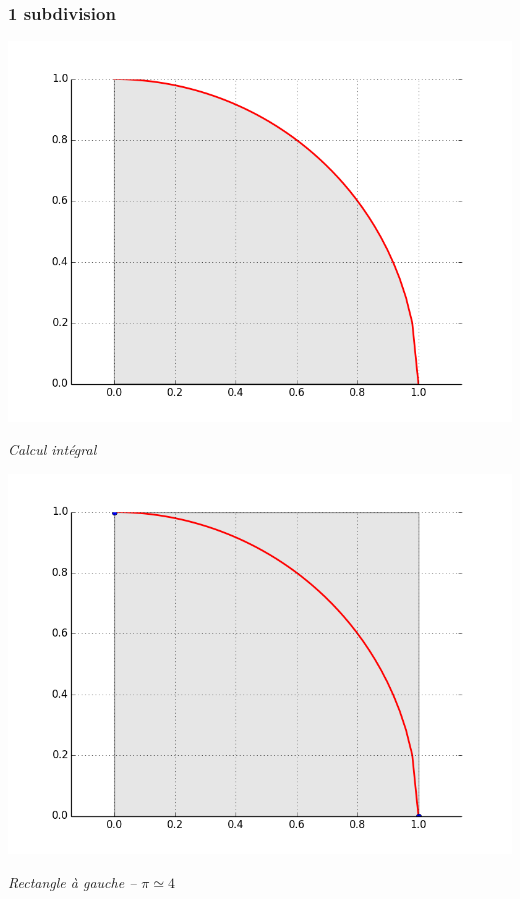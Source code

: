 \documentclass[10pt,fleqn]{article} %
\begin{document}
\subsubsection*{1 subdivision}

\begin{minipage}[c]{.24\linewidth}
\begin{center}
\includegraphics[width=.99\textwidth]{images/CourbesPython/pi_courbe}

\textit{Calcul intégral}
\end{center}
\end{minipage}\hfill
\begin{minipage}[c]{.24\linewidth}
\begin{center}
\includegraphics[width=.99\textwidth]{images/CourbesPython/pi_rect_g_1}

\textit{Rectangle à gauche -- $\pi \simeq 4$  }
\end{center}
\end{minipage}\hfill
\end{document}

